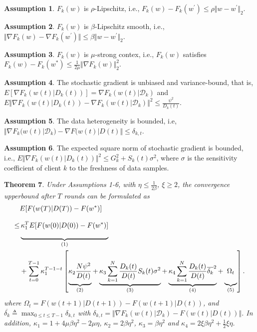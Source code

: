 \documentclass{article}
\theoremstyle{plain}
\newtheorem{theorem}{Theorem}[section]
\theoremstyle{definition}
\newtheorem{assumption}[theorem]{Assumption}
\theoremstyle{remark}
\begin{document}
\begin{assumption}
  $F_k(w)$ is $\rho$-Lipschitz, i.e., $F_k(w) - F_k(w^{'}) \leq \rho \Vert w - w^{'} \Vert_2$.
\end{assumption}
\begin{assumption}
  $F_k(w)$ is $\beta$-Lipschitz smooth, i.e., $\Vert\nabla F_k(w) - \nabla F_k(w^{'})\Vert \leq \beta \Vert w-w^{'} \Vert_2$.
\end{assumption}
\begin{assumption}
  $F_k(w)$ is $\mu$-strong contex, i.e., $F_k(w)$ satisfies $F_k(w) - F_k(w^*) \leq \frac{1}{2\mu}\Vert\nabla F_k(w)\Vert_2^2$.
\end{assumption}
\begin{assumption}
  The stochastic gradient is unbiased and variance-bound, that is, $E[\nabla F_k(w(t)|D_k(t))] = \nabla F_k(w(t)|\mathcal{D}_k)$ and $E\Vert\nabla F_k(w(t)|D_k(t)) - \nabla F_k(w(t)|\mathcal{D}_k)\Vert^2 \leq \frac{\psi^2}{D_k(t)}$. 
\end{assumption}
\begin{assumption}
  The data heterogeneity is bounded, i.e, $\Vert \nabla F_k(w(t)|\mathcal{D}_k) - \nabla F(w(t)|D(t)\Vert \leq \delta_{k,t}$. 
\end{assumption}
\begin{assumption}
  The expected square norm of stochastic gradient is bounded, i.e., $E\Vert \nabla F_k(w(t)|D_k(t))\Vert^2 \leq G_k^2 + S_k(t)\sigma^2$, where $\sigma$ is the sensitivity coefficient of client $k$ to the freshness of data samples.
\end{assumption}

\begin{theorem}
  Under Assumptions 1-6, with $\eta \leq \frac{1}{2\beta}$, $\xi \geq 2$, the convergence upperbound after $T$ rounds can be formulated as
  \begin{align}
      & E[F(w(T)|D(T)) - F(w^*)] \notag \\ 
 \leq & \underbrace{\vphantom{\sum_{min}^{max}\frac{1}{2}} \kappa_1^{T} E[F(w(0)|D(0))-F(w^*)]}_{(1)} \notag \\
      & + \sum_{t=0}^{T-1} \kappa_1^{T-1-t} \left[\underbrace{\vphantom{\sum_{min}^{max}\frac{1}{2}} \kappa_2 \frac{N\psi^2}{D(t)}}_{(2)} + \underbrace{\vphantom{\sum_{min}^{max}\frac{1}{2}} \kappa_3 \sum_{k=1}^{N} \frac{D_k(t)}{D(t)} S_k(t) \sigma^2}_{(3)} + \underbrace{\vphantom{\sum_{min}^{max}\frac{1}{2}} \kappa_4 \sum_{k=1}^{N} \frac{D_k(t)}{D(t)} \overline{\delta_k}^2}_{(4)} + \underbrace{\vphantom{\sum_{min}^{max}\frac{1}{2}} \Omega_{t}}_{(5)}\right]. \notag \\ 
  \end{align}
  where $\Omega_t = F(w(t+1)|D(t+1)) - F(w(t+1)|D(t))$,
  and $\overline{\delta_k} \triangleq \max_{0 \leq t \leq T-1} \delta_{k,t}$ with $\delta_{k,t} = \Vert \nabla F_k(w(t)|\mathcal{D}_k) - F(w(t)|D(t)) \Vert$.
  In addition, $\kappa_1 = 1 + 4\mu\beta\eta^2 - 2\mu\eta$, $\kappa_2 = 2\beta\eta^2$, $\kappa_3 = \beta\eta^2$ and $\kappa_4 = 2\xi\beta\eta^2 + \frac{1}{2}\xi\eta$. 
\end{theorem}
\end{document}
